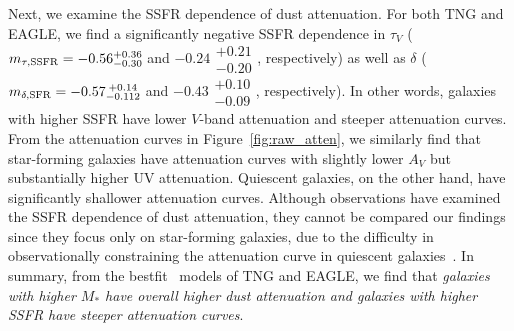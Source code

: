 Next, we examine the SSFR dependence of dust attenuation. For both TNG and
EAGLE, we find a significantly negative SSFR dependence in $\tau_V$ 
($m_{\tau,{\rm SSFR}} = -0.56\substack{+0.36 \\ -0.30}$ and
$-0.24\substack{+0.21 \\ -0.20}$, respectively) as well as $\delta$ 
($m_{\delta,{\rm SFR}} = -0.57\substack{+0.14 \\ -0.112}$ and $-0.43\substack{+0.10 \\ -0.09}$,
respectively). In other words, galaxies with higher SSFR have lower $V$-band
attenuation and steeper attenuation curves. From the attenuation curves in
Figure~\ref{fig:raw_atten}, we similarly find that star-forming galaxies have
attenuation curves with slightly lower $A_V$ but substantially higher UV 
attenuation. Quiescent galaxies, on the other hand, have significantly 
shallower attenuation curves. Although observations have examined the
SSFR dependence of dust attenuation, they cannot be compared our findings since
they focus only on star-forming galaxies, due to the difficulty in
observationally constraining the attenuation curve in quiescent
galaxies~\citep[\eg][]{garn2010, reddy2015, battisti2016, battisti2017, salim2018}. 
In summary, from the bestfit \eda~models of TNG and EAGLE, we find that
\emph{galaxies with higher $M_*$ have overall higher dust attenuation and
galaxies with higher SSFR have steeper attenuation curves}.
